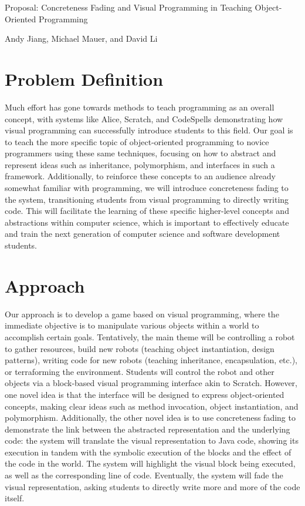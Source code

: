 \documentclass[12pt,notitlepage]{article}
\begin{document}
\begingroup
  \centering
  {\Large Proposal: Concreteness Fading and Visual Programming in
  Teaching Object-Oriented Programming\\[1em]}

  Andy Jiang, Michael Mauer, and David Li\par
\endgroup

\section{Problem Definition}

Much effort has gone towards methods to teach programming as an
overall concept, with systems like Alice, Scratch, and CodeSpells
demonstrating how visual programming can successfully introduce
students to this field. Our goal is to teach the more specific topic
of object-oriented programming to novice programmers using these same
techniques, focusing on how to abstract and represent ideas such as
inheritance, polymorphism, and interfaces in such a framework.
Additionally, to reinforce these concepts to an audience already
somewhat familiar with programming, we will introduce concreteness
fading to the system, transitioning students from visual programming
to directly writing code. This will facilitate the learning of these
specific higher-level concepts and abstractions within computer
science, which is important to effectively educate and train the next
generation of computer science and software development students.

\section{Approach}

Our approach is to develop a game based on visual programming, where
the immediate objective is to manipulate various objects within a
world to accomplish certain goals. Tentatively, the main theme will be
controlling a robot to gather resources, build new robots (teaching
object instantiation, design patterns), writing code for new robots
(teaching inheritance, encapsulation, etc.), or terraforming the
environment. Students will control the robot and other objects via a
block-based visual programming interface akin to Scratch. However, one
novel idea is that the interface will be designed to express
object-oriented concepts, making clear ideas such as method
invocation, object instantiation, and polymorphism. Additionally, the
other novel idea is to use concreteness fading to demonstrate the link
between the abstracted representation and the underlying code: the
system will translate the visual representation to Java code, showing
its execution in tandem with the symbolic execution of the blocks and
the effect of the code in the world. The system will highlight the
visual block being executed, as well as the corresponding line of
code. Eventually, the system will fade the visual representation,
asking students to directly write more and more of the code itself.
\end{document}
